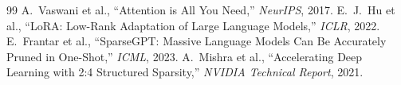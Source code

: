 \begin{thebibliography}{99}
 A.~Vaswani et al., ``Attention is All You Need,'' \emph{NeurIPS}, 2017.
 E.~J.~Hu et al., ``LoRA: Low-Rank Adaptation of Large Language Models,'' \emph{ICLR}, 2022.
 E.~Frantar et al., ``SparseGPT: Massive Language Models Can Be Accurately Pruned in One-Shot,'' \emph{ICML}, 2023.
 A.~Mishra et al., ``Accelerating Deep Learning with 2:4 Structured Sparsity,'' \emph{NVIDIA Technical Report}, 2021.
\end{thebibliography}
